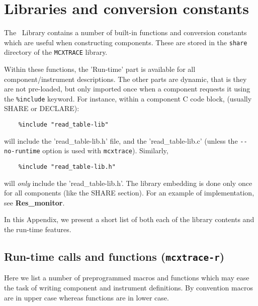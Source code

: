 
\chapter{Libraries and conversion constants}
\label{c:kernelcalls}

The \MCX\ Library contains a number of built-in functions
and conversion constants which are useful when constructing
components. These are stored in the \verb+share+ directory of
the \verb+MCXTRACE+ library. 

Within these functions, the 'Run-time' part is available for all
component/instrument descriptions. The other parts
are dynamic, that is they are not
pre-loaded, but only imported once when a component requests it
using the \verb+%include+ \MCX keyword. For instance, within a
component C code block, (usually SHARE or DECLARE):
\begin{lstlisting}
    %include "read_table-lib"
\end{lstlisting}
will include the 'read\_table-lib.h' file, and the 'read\_table-lib.c'
(unless the \verb+--no-runtime+ option is used with \verb+mcxtrace+).
Similarly,
\begin{lstlisting}
    %include "read_table-lib.h"
\end{lstlisting}
will \emph{only} include the 'read\_table-lib.h'.
The library embedding is done only once for all components (like the
 SHARE section).  For an example
of implementation, see {\bfseries Res\_monitor}.

In this Appendix, we present a short list of both each of the library contents
and the run-time features.

\section{Run-time calls and functions (\texttt{mcxtrace-r})}
\label{s:calls:run-time}
Here we list a number of preprogrammed macros and functions
which may ease the task of writing component and instrument definitions.
By convention macros are in upper case whereas functions are in lower case.

